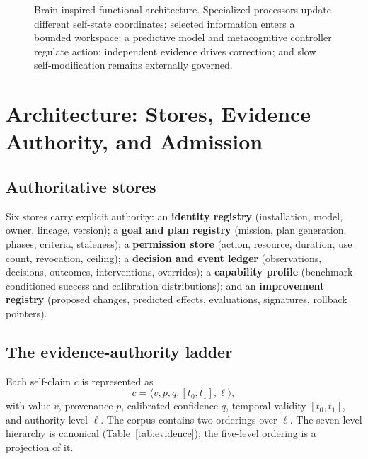 \documentclass[11pt]{article}
\begin{document}
\begin{figure}[t]
\caption{Brain-inspired functional architecture. Specialized processors update different self-state coordinates; selected information enters a bounded workspace; a predictive model and metacognitive controller regulate action; independent evidence drives correction; and slow self-modification remains externally governed.}
\label{fig:arch}
\end{figure}

\section{Architecture: Stores, Evidence Authority, and Admission}
\label{sec:architecture}

\subsection{Authoritative stores}
Six stores carry explicit authority: an \textbf{identity registry} (installation, model, owner, lineage, version); a \textbf{goal and plan registry} (mission, plan generation, phases, criteria, staleness); a \textbf{permission store} (action, resource, duration, use count, revocation, ceiling); a \textbf{decision and event ledger} (observations, decisions, outcomes, interventions, overrides); a \textbf{capability profile} (benchmark-conditioned success and calibration distributions); and an \textbf{improvement registry} (proposed changes, predicted effects, evaluations, signatures, rollback pointers).

\subsection{The evidence-authority ladder}
Each self-claim $c$ is represented as
\begin{equation}
c = \langle v, p, q, [t_0, t_1], \ell \rangle,
\label{eq:claim}
\end{equation}
with value $v$, provenance $p$, calibrated confidence $q$, temporal validity $[t_0,t_1]$, and authority level $\ell$. The corpus contains two orderings over $\ell$. The seven-level hierarchy is canonical (Table~\ref{tab:evidence}); the five-level ordering is a projection of it.
\end{document}
